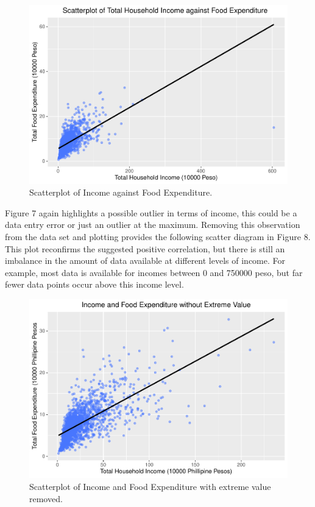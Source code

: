 \documentclass[
]{article}
\begin{document}
\begin{figure}[H]

{\centering \includegraphics[width=0.8\linewidth]{Group_01_Project2_demo_files/figure-latex/balance_plot-1} 

}

\caption{Scatterplot of Income against Food Expenditure.}\label{fig:balance_plot}
\end{figure}

Figure 7 again highlights a possible outlier in terms of income, this
could be a data entry error or just an outlier at the maximum. Removing
this observation from the data set and plotting provides the following
scatter diagram in Figure 8. This plot reconfirms the suggested positive
correlation, but there is still an imbalance in the amount of data
available at different levels of income. For example, most data is
available for incomes between 0 and 750000 peso, but far fewer data
points occur above this income level.

\begin{figure}[H]

{\centering \includegraphics[width=0.8\linewidth]{Group_01_Project2_demo_files/figure-latex/balance without outlier-1} 

}

\caption{Scatterplot of Income and Food Expenditure with extreme value removed.}\label{fig:balance without outlier}
\end{figure}
\end{document}
